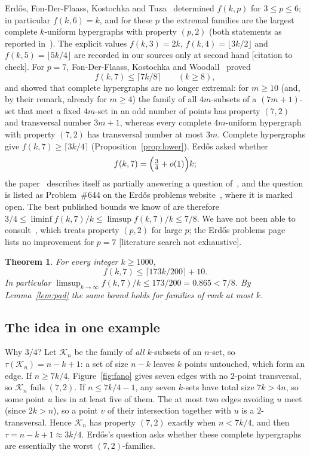 \documentclass[11pt]{amsart}
\newtheorem{theorem}{Theorem}[section]
\theoremstyle{definition}
\theoremstyle{remark}
\newcommand{\ceil}[1]{\lceil #1\rceil}
\newcommand{\floor}[1]{\lfloor #1\rfloor}
\begin{document}
Erd\H{o}s, Fon-Der-Flaass, Kostochka and Tuza~\cite{EFKT} determined $f(k,p)$ for $3\le p\le6$; in particular $f(k,6)=k$, and for these $p$ the extremal families are the largest complete $k$-uniform hypergraphs with property $(p,2)$ (both statements as reported in~\cite{FKW}). The explicit values $f(k,3)=2k$, $f(k,4)=\floor{3k/2}$ and $f(k,5)=\floor{5k/4}$ are recorded in our sources only at second hand [citation to check]. For $p=7$, Fon-Der-Flaass, Kostochka and Woodall~\cite{FKW} proved
\[
f(k,7)\le\ceil{7k/8}\qquad(k\ge8),
\]
and showed that complete hypergraphs are no longer extremal: for $m\ge10$ (and, by their remark, already for $m\ge4$) the family of all $4m$-subsets of a $(7m+1)$-set that meet a fixed $4m$-set in an odd number of points has property $(7,2)$ and transversal number $3m+1$, whereas every complete $4m$-uniform hypergraph with property $(7,2)$ has transversal number at most $3m$. Complete hypergraphs give $f(k,7)\ge\ceil{3k/4}$ (Proposition~\ref{prop:lower}). Erd\H{o}s asked whether
\[
f(k,7)=\Bigl(\tfrac34+o(1)\Bigr)k ;
\]
the paper~\cite{FKW} describes itself as partially answering a question of~\cite{EFKT}, and the question is listed as Problem~\#644 on the Erd\H{o}s problems website~\cite{EP}, where it is marked open. The best published bounds we know of are therefore $3/4\le\liminf f(k,7)/k\le\limsup f(k,7)/k\le7/8$. We have not been able to consult~\cite{Kos}, which treats property $(p,2)$ for large $p$; the Erd\H{o}s problems page~\cite{EP} lists no improvement for $p=7$ [literature search not exhaustive].

\begin{theorem}\label{thm:main}
For every integer $k\ge1000$,
\[
f(k,7)\le\ceil{173k/200}+10 .
\]
In particular $\limsup_{k\to\infty}f(k,7)/k\le173/200=0.865<7/8$. By Lemma~\ref{lem:pad} the same bound holds for families of rank at most $k$.
\end{theorem}

\subsection*{The idea in one example}
Why $3/4$? Let $\mathcal K_n$ be the family of \emph{all} $k$-subsets of an $n$-set, so $\tau(\mathcal K_n)=n-k+1$: a set of size $n-k$ leaves $k$ points untouched, which form an edge. If $n\ge7k/4$, Figure~\ref{fig:fano} gives seven edges with no $2$-point transversal, so $\mathcal K_n$ fails $(7,2)$. If $n\le 7k/4-1$, any seven $k$-sets have total size $7k>4n$, so some point $u$ lies in at least five of them. The at most two edges avoiding $u$ meet (since $2k>n$), so a point $v$ of their intersection together with $u$ is a $2$-transversal. Hence $\mathcal K_n$ has property $(7,2)$ exactly when $n<7k/4$, and then $\tau=n-k+1\approx3k/4$. Erd\H{o}s's question asks whether these complete hypergraphs are essentially the worst $(7,2)$-families.
\end{document}
